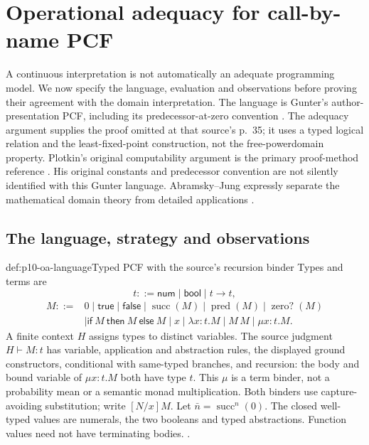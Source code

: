 \section{Operational adequacy for call-by-name PCF}
\label{sec:p10-operational-adequacy-domain-models}

A continuous interpretation is not automatically an adequate programming
model. We now specify the language, evaluation and observations before
proving their agreement with the domain interpretation. The language is
Gunter's author-presentation PCF, including its predecessor-at-zero
convention \cite[Sections~4.1--4.4, pp.~29--35]{Gunter1994TypesAuthorOA}.
The adequacy argument supplies the proof omitted at that source's p.~35;
it uses a typed logical relation and the least-fixed-point construction,
not the free-powerdomain property. Plotkin's original computability
argument is the primary proof-method reference
\cite[Theorem~3.1; Lemmas~3.2--3.3, pp.~230--232]{Plotkin1977LCFAuthorOA}.
His original constants and predecessor convention are not silently
identified with this Gunter language. Abramsky--Jung expressly separate
the mathematical domain theory from detailed applications
\cite[pp.~7,148--149]{AbramskyJungCorrectedExpandedDomainTheory}.

\subsection{The language, strategy and observations}

\begin{hbdefinition}{def:p10-oa-language}{Typed PCF with the source's recursion binder}
Types and terms are
\[
 t::=\mathsf{num}\mid\mathsf{bool}\mid t\to t,
\]
\[
 \begin{split}
 M::={}&0\mid\mathsf{true}\mid\mathsf{false}
 \mid\operatorname{succ}(M)\mid\operatorname{pred}(M)
 \mid\operatorname{zero?}(M)\\
 &\mid\mathsf{if}\ M\ \mathsf{then}\ M\ \mathsf{else}\ M
 \mid x\mid\lambda x:t.M\mid M\,M\mid\mu x:t.M.
 \end{split}
\]
A finite context \(H\) assigns types to distinct variables.
The source judgment \(H\vdash M:t\) has variable, application and
abstraction rules, the displayed ground constructors, conditional with
same-typed branches, and recursion: the body and bound variable of
\(\mu x:t.M\) both have type \(t\). This \(\mu\) is a term binder,
not a probability mean or a semantic monad multiplication.
Both binders use capture-avoiding substitution; write \([N/x]M\).
Let \(\bar n=\operatorname{succ}^n(0)\).
The closed well-typed values are numerals, the two booleans and typed
abstractions. Function values need not have terminating bodies.
\cite[pp.~17--18,29--31]{Gunter1994TypesAuthorOA}.
\end{hbdefinition}

